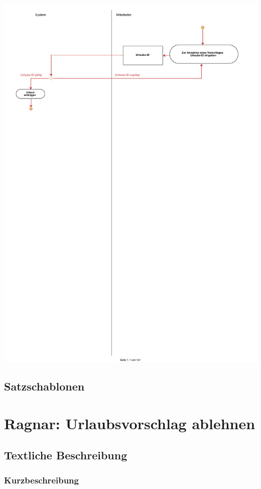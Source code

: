 \begin{center}
\includegraphics[width=0.9\linewidth]{Urlaubsvorschlag_annehmen.pdf}
\end{center}

\subsection{Satzschablonen}


\section{Ragnar: Urlaubsvorschlag ablehnen}

\subsection{Textliche Beschreibung}

\subsubsection{Kurzbeschreibung}

